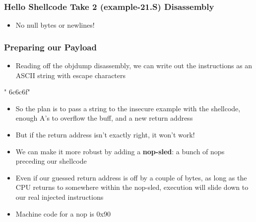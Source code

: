 \documentclass[11pt,xcolor=dvipsnames]{beamer}
\newcommand{\mvs}{\vspace{-0.95em}}
\begin{document}
\begin{frame}[fragile,t]
\frametitle{Hello Shellcode Take 2 (example-21.S) Disassembly}
\mvs
{}
\begin{itemize}
  \item No null bytes or newlines!
\end{itemize}
\end{frame}


\begin{frame}[fragile,t]
\frametitle{Preparing our Payload}
\begin{itemize}
  \item Reading off the {\ttfamily objdump} disassembly, we can write out the instructions as an ASCII string with escape characters
\end{itemize}
\begin{textcode}
"\xeb{}\xdb{}\xcd
{}\xcd{}\xff\xff\xff{}\x6c\x6c\x6f"
\end{textcode}
\pause
\begin{itemize}
  \item So the plan is to pass a string to the insecure example with the shellcode, enough A's to overflow the buff, and a new return address
\pause
  \item But if the return address isn't exactly right, it won't work!
\pause
  \item We can make it more robust by adding a \textbf{nop-sled}: a bunch of nops preceding our shellcode
  \item Even if our guessed return address is off by a couple of bytes, as long as the CPU returns to somewhere within the nop-sled, execution will slide down to our real injected instructions
  \item Machine code for a {\ttfamily nop} is {\ttfamily 0x90}
\end{itemize}
\end{frame}
\end{document}
